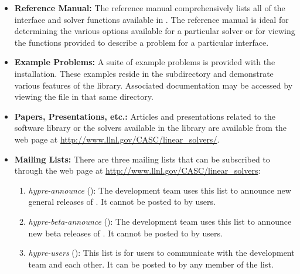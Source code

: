 \begin{itemize}

\item
{\bf Reference Manual:} The reference manual comprehensively lists all
of the interface and solver functions available in \hypre{}.  The
reference manual is ideal for determining the various options
available for a particular solver or for viewing the functions
provided to describe a problem for a particular interface. 

\item{\bf Example Problems:} A suite of example problems is provided
with the \hypre{} installation.  These examples reside in the 
subdirectory and demonstrate various features of the \hypre{} library.
Associated documentation may be accessed by viewing the 
file in that same directory.

\item
{\bf Papers, Presentations, etc.:} Articles and presentations related to the
\hypre{} software library or the solvers available
in the library are available from the \hypre{} web page at
\url{http://www.llnl.gov/CASC/linear_solvers/}.

\item{\bf Mailing Lists:} There are three \hypre{} mailing lists that can be subscribed to through the
\hypre{} web page at \url{http://www.llnl.gov/CASC/linear_solvers}:

\begin{enumerate}
\item {\sl hypre-announce} (): The
development team uses this list to announce new general releases of \hypre{}.
It cannot be posted to by users.

\item {\sl hypre-beta-announce} (): The
development team uses this list to announce new beta releases of \hypre{}.  It
cannot be posted to by users.

\item {\sl hypre-users} (): This list is for
\hypre{} users to communicate with the development team and each other.  It can
be posted to by any member of the list.
\end{enumerate}



\end{itemize}


